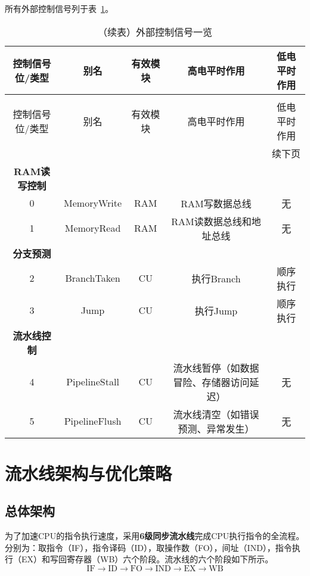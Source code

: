 \documentclass[lang=cn,a4paper,newtx]{elegantpaper}
\begin{document}
所有外部控制信号列于表~\ref{tab:CPU:ExternalControl}。
\begin{longtable}{c c c c c}
  \caption{外部控制信号一览} \label{tab:CPU:ExternalControl} \\
  \toprule
  控制信号位/类型 & 别名  & 有效模块 & 高电平时作用 & 低电平时作用\\
  \midrule
  \endfirsthead

  \caption[]{（续表）外部控制信号一览} \\
  \toprule
  控制信号位/类型 & 别名  & 有效模块 & 高电平时作用 & 低电平时作用 \\
  \midrule
  \endhead

  \midrule
  \multicolumn{5}{r}{续下页} \\
  \midrule
  \endfoot

  \bottomrule
  \endlastfoot
  \textbf{RAM读写控制}\\
  \hline
  0  & MemoryWrite    & RAM  & RAM写数据总线 & 无\\
  1  & MemoryRead     & RAM  & RAM读数据总线和地址总线 & 无\\
  \hline
  \textbf{分支预测} \\
  \hline
  2   & BranchTaken    & CU   & 执行Branch     & 顺序执行 \\
  3   & Jump            & CU  & 执行Jump        & 顺序执行 \\
  \hline
  \textbf{流水线控制}  \\
  \hline
  4   & PipelineStall & CU    & 流水线暂停（如数据冒险、存储器访问延迟） & 无 \\
  5   & PipelineFlush & CU    & 流水线清空（如错误预测、异常发生）      & 无 \\

\end{longtable}
\section{流水线架构与优化策略}
\subsection{总体架构}
为了加速CPU的指令执行速度，采用\textbf{6级同步流水线}完成CPU执行指令的全流程。分别为：取指令（IF），指令译码（ID），取操作数（FO），间址（IND），指令执行（EX）和写回寄存器（WB）六个阶段。流水线的六个阶段如下所示。
$$
  \text{IF} \rightarrow \text{ID} \rightarrow \text{FO}\rightarrow \text{IND} \rightarrow \text{EX} \rightarrow \text{WB}
$$
\end{document}
